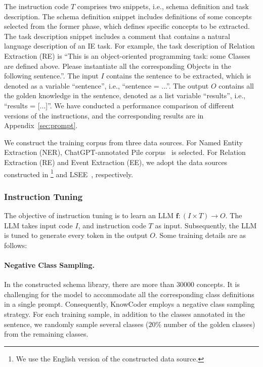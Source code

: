   The instruction code $T$ comprises two snippets, i.e., schema definition and task description. The schema definition snippet includes definitions of some concepts selected from the former phase, which defines specific concepts to be extracted. The task description snippet includes a comment that contains a natural language description of an IE task. For example, the task description of Relation Extraction (RE) is ``This is an object-oriented programming task: some Classes are defined above. Please instantiate all the corresponding Objects in the following sentence.''. The input $I$ contains the sentence to be extracted, which is denoted as a variable ``sentence'', i.e., ``sentence = ...''. The output $O$ contains all the golden knowledge in the sentence, denoted as a list variable ``results'', i.e., ``results = [...]''. We have conducted a performance comparison of different versions of the instructions, and the corresponding results are in Appendix~\ref{sec:prompt}.
  
  We construct the training corpus from three data sources. For Named Entity Extraction (NER), ChatGPT-annotated Pile corpus~\cite{zhou2023universalner} is selected. For Relation Extraction (RE) and Event Extraction (EE), we adopt the data sources constructed in \citet{gui2023instructie}\footnote{We use the English version of the constructed data source.} and LSEE~\cite{chen-etal-2017-automatically}, respectively. 

\subsubsection{Instruction Tuning}

The objective of instruction tuning is to learn an LLM $\mathbf{f}:(I \times T) \rightarrow O$. The LLM takes input code $I$, and instruction code $T$ as input. Subsequently, the LLM is tuned to generate every token in the output $O$. Some training details are as follows:

\paragraph{Negative Class Sampling.} In the constructed schema library, there are more than $30000$ concepts. It is challenging for the model to accommodate all the corresponding class definitions in a single prompt. Consequently, KnowCoder employs a negative class sampling strategy. For each training sample, in addition to the classes annotated in the sentence, we randomly sample several classes ($20\%$ number of the golden classes) from the remaining classes.

